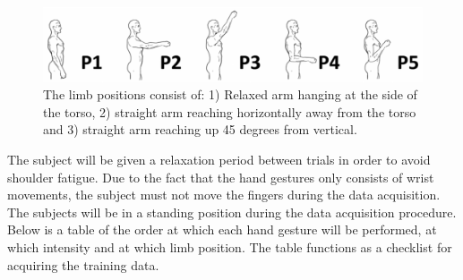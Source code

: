 \begin{figure}[H]                    
	\includegraphics[width=1\textwidth]{figures/protocol/limb_position}  %
	\caption{The limb positions consist of: 1) Relaxed arm hanging at the side of the torso, 2) straight arm reaching horizontally away from the torso and 3) straight arm reaching up 45 degrees from vertical.}
	\label{fig:limbpos}  %
\end{figure}

The subject will be given a relaxation period between trials in order to avoid shoulder fatigue.
Due to the fact that the hand gestures only consists of wrist movements, the subject must not move the fingers during the data acquisition.
The subjects will be in a standing position during the data acquisition procedure.
Below is a table of the order at which each hand gesture will be performed, at which intensity and at which limb position. The table functions as a checklist for acquiring the training data.


